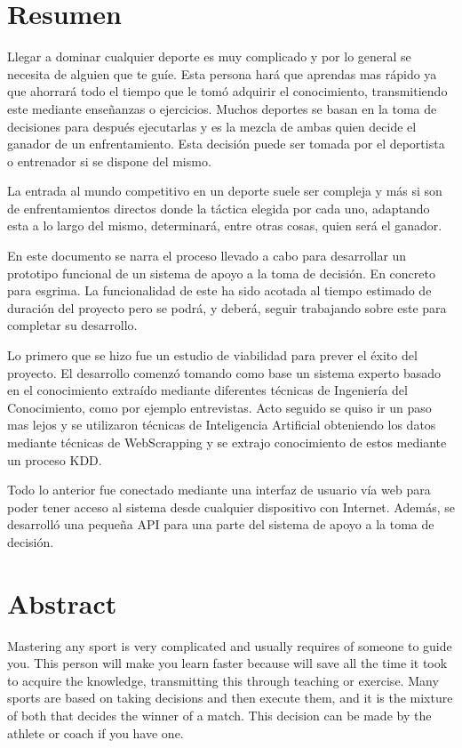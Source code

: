 \chapter{Resumen}

Llegar a dominar cualquier deporte es muy complicado y por lo general se necesita
 de alguien que te guíe. Esta persona hará que aprendas mas rápido ya que
 ahorrará todo el tiempo que le tomó adquirir el conocimiento, transmitiendo este
 mediante enseñanzas o ejercicios. Muchos deportes se basan en la toma de
 decisiones para después ejecutarlas y es la mezcla de ambas quien decide el
 ganador de un enfrentamiento. Esta decisión puede ser tomada por el deportista o
 entrenador si se dispone del mismo.

La entrada al mundo competitivo en un deporte suele ser compleja y más si son de
 enfrentamientos directos donde la táctica elegida por cada uno, adaptando esta a
 lo largo del mismo, determinará, entre otras cosas, quien
 será el ganador.

En este documento se narra el proceso llevado a cabo para desarrollar un prototipo
 funcional de un sistema de apoyo a la toma de decisión. En concreto para
 esgrima. La funcionalidad de este ha sido acotada al tiempo estimado de duración
 del proyecto pero se podrá, y deberá, seguir trabajando sobre este para completar
 su desarrollo.

Lo primero que se hizo fue un estudio de viabilidad para prever el éxito del
 proyecto. El desarrollo comenzó tomando como base un sistema experto basado en
 el conocimiento extraído mediante diferentes técnicas de Ingeniería del Conocimiento, como por ejemplo entrevistas. Acto seguido se quiso ir un paso
 mas lejos y se utilizaron técnicas de Inteligencia Artificial obteniendo
 los datos mediante técnicas de WebScrapping y se extrajo conocimiento de estos
 mediante un proceso KDD.

Todo lo anterior fue conectado mediante una interfaz de usuario vía web para
 poder tener acceso al sistema desde cualquier dispositivo con Internet. Además,
 se desarrolló una pequeña API para una parte del sistema de apoyo a la toma de decisión.


\chapter{Abstract}

Mastering any sport is very complicated and usually requires
of someone to guide you. This person will make you learn faster because
will save all the time it took to acquire the knowledge, transmitting this
through teaching or exercise. Many sports are based on taking
decisions and then execute them, and it is the mixture of both that decides the
winner of a match. This decision can be made by the athlete or
coach if you have one.


